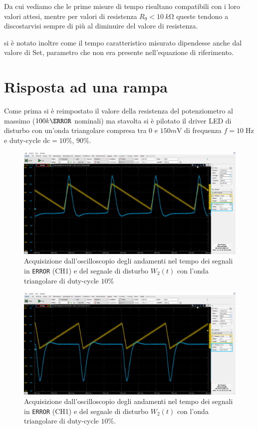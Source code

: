\documentclass[10pt, a4paper, italian]{article}
\begin{document}
Da cui vediamo che le prime misure di tempo risultano compatibili con i loro
valori attesi, mentre per valori di resistenza $R_9 < \SI{10}{k\ohm}$ queste
tendono a discostarvisi sempre di più al diminuire del valore di resistenza.

si è notato inoltre come il tempo caratteristico misurato dipendesse anche dal valore di Set, parametro che non era presente nell'equazione di riferimento.

\section{Risposta ad una rampa}
Come prima si è reimpostato il valore della resistenza del potenziometro al
massimo ($100 k\ohm$ nominali) ma stavolta si è pilotato il driver LED di
disturbo con un'onda triangolare compresa tra $0$ e $150 \si{m\V}$ di frequenza
$f = 10 \; \si{\Hz}$ e duty-cycle $\text{dc} = 10 \percent$, $90 \percent$.
\begin{figure}[htbp]
    \centering
	\includegraphics[width=\textwidth]{8}
    \caption{Acquisizione dall'oscilloscopio degli andamenti nel tempo dei
    segnali in \texttt{ERROR} (CH1) e del segnale di disturbo $W_2 (t)$
    con l'onda triangolare di duty-cycle $10 \percent$
    \label{fig: erramp10}}
\end{figure}
\begin{figure}[htbp]
    \centering
	\includegraphics[width=\textwidth]{8.1}
    \caption{Acquisizione dall'oscilloscopio degli andamenti nel tempo dei
    segnali in \texttt{ERROR} (CH1) e del segnale di disturbo $W_2 (t)$
    con l'onda triangolare di duty-cycle $10 \percent$.
    \label{fig: erramp90}}
\end{figure}
\end{document}
